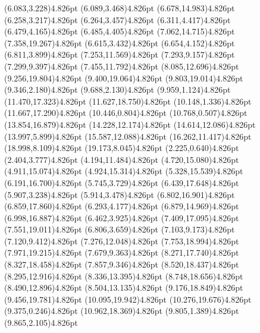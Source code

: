 \documentclass[10pt]{article}
\begin{document}
{{\qdisk(6.083,3.228){4.826pt}%
\qdisk(6.089,3.468){4.826pt}%
\qdisk(6.678,14.983){4.826pt}%
\qdisk(6.258,3.217){4.826pt}%
\qdisk(6.264,3.457){4.826pt}%
\qdisk(6.311,4.417){4.826pt}%
\qdisk(6.479,4.165){4.826pt}%
\qdisk(6.485,4.405){4.826pt}%
\qdisk(7.062,14.715){4.826pt}%
\qdisk(7.358,19.267){4.826pt}%
\qdisk(6.615,3.432){4.826pt}%
\qdisk(6.654,4.152){4.826pt}%
\qdisk(6.811,3.899){4.826pt}%
\qdisk(7.253,11.569){4.826pt}%
\qdisk(7.293,9.157){4.826pt}%
\qdisk(7.299,9.397){4.826pt}%
\qdisk(7.455,11.792){4.826pt}%
\qdisk(8.085,12.696){4.826pt}%
\qdisk(9.256,19.804){4.826pt}%
\qdisk(9.400,19.064){4.826pt}%
\qdisk(9.803,19.014){4.826pt}%
\qdisk(9.346,2.180){4.826pt}%
\qdisk(9.688,2.130){4.826pt}%
\qdisk(9.959,1.124){4.826pt}%
\qdisk(11.470,17.323){4.826pt}%
\qdisk(11.627,18.750){4.826pt}%
\qdisk(10.148,1.336){4.826pt}%
\qdisk(11.667,17.290){4.826pt}%
\qdisk(10.446,0.804){4.826pt}%
\qdisk(10.768,0.507){4.826pt}%
\qdisk(13.854,16.879){4.826pt}%
\qdisk(14.228,12.174){4.826pt}%
\qdisk(14.614,12.086){4.826pt}%
\qdisk(13.997,5.899){4.826pt}%
\qdisk(15.587,12.088){4.826pt}%
\qdisk(16.262,11.417){4.826pt}%
\qdisk(18.998,8.109){4.826pt}%
\qdisk(19.173,8.045){4.826pt}%
\dummycolor
\qdisk(2.225,0.640){4.826pt}%
\qdisk(2.404,3.777){4.826pt}%
\qdisk(4.194,11.484){4.826pt}%
\qdisk(4.720,15.080){4.826pt}%
\qdisk(4.911,15.074){4.826pt}%
\qdisk(4.924,15.314){4.826pt}%
\qdisk(5.328,15.539){4.826pt}%
\qdisk(6.191,16.700){4.826pt}%
\qdisk(5.745,3.729){4.826pt}%
\qdisk(6.439,17.648){4.826pt}%
\qdisk(5.907,3.238){4.826pt}%
\qdisk(5.914,3.478){4.826pt}%
\qdisk(6.802,16.901){4.826pt}%
\qdisk(6.859,17.860){4.826pt}%
\qdisk(6.293,4.177){4.826pt}%
\qdisk(6.879,14.969){4.826pt}%
\qdisk(6.998,16.887){4.826pt}%
\qdisk(6.462,3.925){4.826pt}%
\qdisk(7.409,17.095){4.826pt}%
\qdisk(7.551,19.011){4.826pt}%
\qdisk(6.806,3.659){4.826pt}%
\qdisk(7.103,9.173){4.826pt}%
\qdisk(7.120,9.412){4.826pt}%
\qdisk(7.276,12.048){4.826pt}%
\qdisk(7.753,18.994){4.826pt}%
\qdisk(7.971,19.215){4.826pt}%
\qdisk(7.679,9.363){4.826pt}%
\qdisk(8.271,17.740){4.826pt}%
\qdisk(8.327,18.458){4.826pt}%
\qdisk(7.857,9.346){4.826pt}%
\qdisk(8.520,18.437){4.826pt}%
\qdisk(8.295,12.916){4.826pt}%
\qdisk(8.336,13.395){4.826pt}%
\qdisk(8.748,18.656){4.826pt}%
\qdisk(8.490,12.896){4.826pt}%
\qdisk(8.504,13.135){4.826pt}%
\qdisk(9.176,18.849){4.826pt}%
\qdisk(9.456,19.781){4.826pt}%
\qdisk(10.095,19.942){4.826pt}%
\qdisk(10.276,19.676){4.826pt}%
\qdisk(9.375,0.246){4.826pt}%
\qdisk(10.962,18.369){4.826pt}%
\qdisk(9.805,1.389){4.826pt}%
\qdisk(9.865,2.105){4.826pt}%
}}
\end{document}
